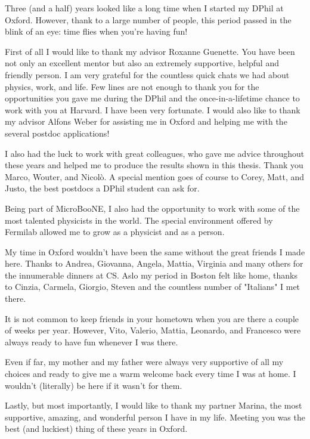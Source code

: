 Three (and a half) years looked like a long time when I started my DPhil at Oxford. However, thank to a large number of people, this period passed in the blink of an eye: time flies when you're having fun!

First of all I would like to thank my advisor Roxanne Guenette. You have been not only an excellent mentor but also an extremely supportive, helpful and friendly person. I am very grateful for the countless quick chats we had about physics, work, and life. Few lines are not enough to thank you for the opportunities you gave me during the DPhil and the once-in-a-lifetime chance to work with you at Harvard. I have been very fortunate. I would also like to thank my advisor Alfons Weber for assisting me in Oxford and helping me with the several postdoc applications!

I also had the luck to work with great colleagues, who gave me advice throughout these years and helped me to produce the results shown in this thesis. Thank you Marco, Wouter, and Nicolò. A special mention goes of course to Corey, Matt, and Justo, the best postdocs a DPhil student can ask for.

Being part of MicroBooNE, I also had the opportunity to work with some of the most talented physicists in the world. The special environment offered by Fermilab allowed me to grow as a physicist and as a person.

My time in Oxford wouldn't have been the same without the great friends I made here. Thanks to Andrea, Giovanna, Angela, Mattia, Virginia and many others for the innumerable dinners at CS.
Aslo my period in Boston felt like home, thanks to Cinzia, Carmela, Giorgio, Steven and the countless number of "Italians" I met there. 

It is not common to keep friends in your hometown when you are there a couple of weeks per year. However, Vito, Valerio, Mattia, Leonardo, and Francesco were always ready to have fun whenever I was there.

Even if far, my mother and my father were always very supportive of all my choices and ready to give me a warm welcome back every time I was at home. I wouldn't (literally) be here if it wasn't for them.

Lastly, but most importantly, I would like to thank my partner Marina, the most supportive, amazing, and wonderful person I have in my life. Meeting you was the best (and luckiest) thing of these years in Oxford.